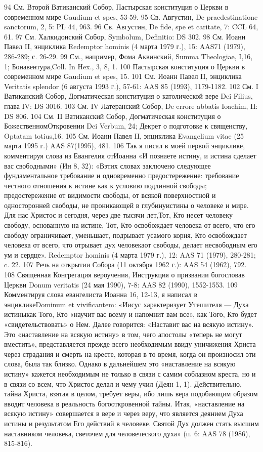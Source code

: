 \documentclass[a5paper,10pt]{article}
\begin{document}
94 См. Второй Ватиканский Собор, Пастырская конституция о Церкви в современном мире Gaudium et spes, 53-59.
95 Св. Августин, De praedestinatione sanctorum, 2, 5: PL 44, 963.
96 Св. Августин, De fide, spe et caritate, 7: CCL 64, 61.
97 См. Халкидонский Собор, Symbolum, Definitio: DS 302.
98 См. Иоанн Павел II, энциклика Redemptor hominis (4 марта 1979 г.), 15: AAS71 (1979), 286-289; с. 26-29.
99 См., например, Фома Аквинский, Summa Theologiae, I,16, 1; Бонавентура,Coll. In Hex., 3, 8, 1.
100 Пастырская конституция о Церкви в современном мире Gaudium et spes, 15.
101 См. Иоанн Павел II, энциклика Veritatis splendor (6 августа 1993 г.), 57-61: AAS 85 (1993), 1179-1182.
102 См. I Ватиканский Собор, Догматическая конституция о католической вере Dei Filius, глава IV: DS 3016.
103 См. IV Латеранский Собор, De errore abbatis Ioachim, II: DS 806.
104 См. II Ватиканский Собор, Догматическая конституция о БожественномОткровении Dei Verbum, 24; Декрет о подготовке к священству, Optatam totius,16.
105 См. Иоанн Павел II, энциклика Evangelium vitae (25 марта 1995 г.) AAS 87(1995), 481.
106 Так я писал в моей первой энциклике, комментируя слова из Евангелия отИоанна «И познаете истину, и истина сделает вас свободными» (Ин 8, 32): «Вэтих словах заключено следующее фундаментальное требование и одновременно предостережение: требование честного отношения к истине как к условию подлинной свободы; предостережение от видимости свободы, от всякой поверхностной и односторонней свободы, не проникающей в глубинуистины о человеке и мире. Для нас Христос и сегодня, через две тысячи лет,Тот, Кто несет человеку свободу, основанную на истине, Тот, Кто освобождает человека от всего, что его свободу ограничивает, уменьшает, подрывает усамого корня, Кто освобождает человека от всего, что отрывает дух человекаот свободы, делает несвободным его ум и сердце». Redemptor hominis (4 марта 1979 г.), 12: AAS 71 (1979), 280-281; c. 22.
107 Речь на открытии Собора (11 октября 1962 г.): AAS 54 (1962), 792.
108 Священная Конгрегация вероучения, Инструкция о призвании богословав Церкви Donum veritatis (24 мая 1990), 7-8: AAS 82 (1990), 1552-1553.
109 Комментируя слова евангелиста Иоанна 16, 12-13, я написал в энцикликеDominum et vivificantem: «Иисус характеризует Утешителя — Духа истиныкак Того, Кто «научит вас всему и напомнит вам все», как Того, Кто будет «свидетельствовать» о Нем. Далее говорится: «Наставит вас на всякую истину». Это «наставление на всякую истину» в том, чего апостолы «теперь не могут вместить», представляется прежде всего необходимым ввиду уничижения Христа через страдания и смерть на кресте, которая в то время, когда он произносил эти слова, была так близко. Однако в дальнейшем это «наставление на всякую истину» кажется необходимым не только в связи с самим соблазном креста, но и в связи со всем, что Христос делал и чему учил (Деян 1, 1). Действительно, тайна Христа, взятая в целом, требует веры, ибо лишь вера подобающим образом вводит человека в реальность богооткровенной тайны. Итак, «наставление на всякую истину» совершается в вере и через веру, что является деянием Духа истины и результатом Его действий в человеке. Святой Дух должен стать высшим наставником человека, светочем для человеческого духа» (п. 6: AAS 78 (1986), 815-816).
\end{document}
